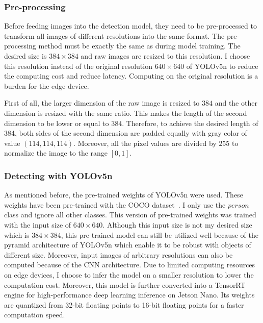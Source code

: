 \documentclass[../main.tex]{subfiles}
\begin{document}
\subsubsection{Pre-processing}
Before feeding images into the detection model, they need to be pre-processed to transform all images of different resolutions into the same format. The pre-processing method must be exactly the same as during model training. The desired size is $384\times384$ and raw images are resized to this resolution. I choose this resolution instead of the original resolution $640\times640$ of YOLOv5n to reduce the computing cost and reduce latency. Computing on the original resolution is a burden for the edge device.

First of all, the larger dimension of the raw image is resized to $384$ and the other dimension is resized with the same ratio. This makes the length of the second dimension to be lower or equal to $384$. Therefore, to achieve the desired length of 384, both sides of the second dimension are padded equally with gray color of value $(114, 114, 114)$. Moreover, all the pixel values are divided by $255$ to normalize the image to the range $[0, 1]$.


\subsubsection{Detecting with YOLOv5n}
As mentioned before, the pre-trained weights of YOLOv5n were used. These weights have been pre-trained with the COCO dataset~\cite{lin2014microsoft}. I only use the $person$ class and ignore all other classes. This version of pre-trained weights was trained with the input size of $640\times640$. Although this input size is not my desired size which is $384\times384$, this pre-trained model can still be utilized well because of the pyramid architecture of YOLOv5n which enable it to be robust with objects of different size. Moreover, input images of arbitrary resolutions can also be computed because of the CNN architecture. Due to limited computing resources on edge devices, I choose to infer the model on a smaller resolution to lower the computation cost. Moreover, this model is further converted into a TensorRT engine for high-performance deep learning inference on Jetson Nano. Its weights are quantized from 32-bit floating points to 16-bit floating points for a faster computation speed.
\end{document}

